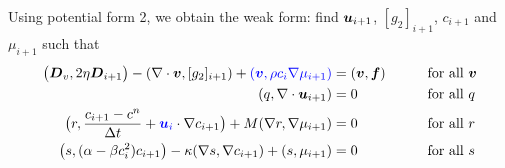 Using potential form 2, we obtain the weak form:
find $\boldsymbol{u}_{i+1}$, $[g_2]_{i+1}$, $c_{i+1}$ and $\mu_{i+1}$ such that
\begin{alignat*}{6}
\big(\boldsymbol{D}_v,2\eta \boldsymbol{D}_{i+1} \big) -(\nabla\cdot\boldsymbol{v},[g_2]_{i+1})
+\textcolor{blue}{( \boldsymbol{v}, \rho c_{i}\nabla \mu_{i+1})}&=(\boldsymbol{v}, \boldsymbol{f})
&\qquad&\text{for all }\boldsymbol{v}\\
(q,\nabla\cdot\boldsymbol{u}_{i+1})&=0&\qquad&\text{for all }q \\
\big(r,\frac{c_{i+1}-c^n}{\Delta t}+\textcolor{blue}{\boldsymbol{u}_i}\cdot\nabla c_{i+1}\big)
+M(\nabla r,\nabla \mu_{i+1})&=0 &\qquad&\text{for all } r\\
\big(s, (\alpha -\beta c_{i}^2)c_{i+1}\big)-\kappa(\nabla s,\nabla c_{i+1}) 
+(s,\mu_{i+1})&=0&\qquad&\text{for all } s
\end{alignat*}

